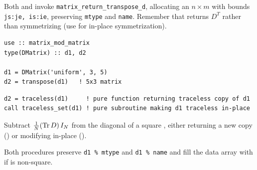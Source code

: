 Both  and  invoke \texttt{matrix\_return\_transpose\_d}, allocating an $n \times m$  with bounds \texttt{js:je, is:ie}, preserving \texttt{mtype} and \texttt{name}. Remember that  returns $D^T$ rather than symmetrizing  (use  for in-place symmetrization).

\begin{description}[leftmargin=2.2cm, style=nextline]
\end{description}

\lstset{language=[95]Fortran}
\begin{lstlisting}
use :: matrix_mod_matrix
type(DMatrix) :: d1, d2

d1 = DMatrix('uniform', 3, 5)
d2 = transpose(d1)   ! 5x3 matrix
\end{lstlisting}


\lstset{language=[95]Fortran}
\begin{lstlisting}
d2 = traceless(d1)     ! pure function returning traceless copy of d1
call traceless_set(d1) ! pure subroutine making d1 traceless in-place
\end{lstlisting}

Subtract $\frac{1}{N}({\rm Tr\,} D)\, I_N$ from the diagonal of a square , either returning a new copy () or modifying  in-place ().

Both procedures preserve \texttt{d1 \% mtype} and \texttt{d1 \% name} and fill the data array with  if  is non-square.

